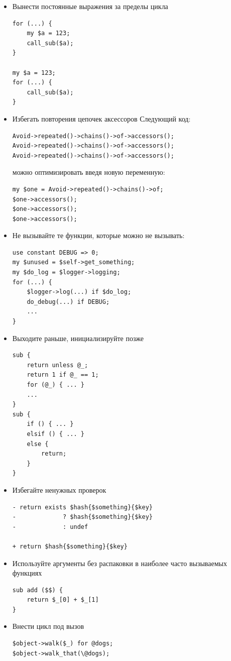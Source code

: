 \begin{itemize}
\item Вынести постоянные выражения за пределы цикла
\begin{verbatim}
for (...) {
	my $a = 123;
	call_sub($a);
}

my $a = 123;
for (...) {
	call_sub($a);
}
\end{verbatim}
	\item Избегать повторения цепочек аксессоров
Следующий код:
\begin{verbatim}
Avoid->repeated()->chains()->of->accessors();
Avoid->repeated()->chains()->of->accessors();
Avoid->repeated()->chains()->of->accessors();
\end{verbatim}
можно оптимизировать введя новую переменную:
\begin{verbatim}
my $one = Avoid->repeated()->chains()->of;
$one->accessors();
$one->accessors();
$one->accessors();
\end{verbatim}
\item Не вызывайте те функции, которые можно не вызывать:
\begin{verbatim}
use constant DEBUG => 0;
my $unused = $self->get_something;
my $do_log = $logger->logging;
for (...) {
	$logger->log(...) if $do_log;
	do_debug(...) if DEBUG;
	...
}
\end{verbatim}

\item Выходите раньше, инициализируйте позже
\begin{verbatim}
sub {
    return unless @_;
    return 1 if @_ == 1;
    for (@_) { ... }
    ...
}
sub {
    if () { ... }
    elsif () { ... }
    else {
        return;
    }
}
\end{verbatim}

\item Избегайте ненужных проверок
\begin{verbatim}
- return exists $hash{$something}{$key}
-             ? $hash{$something}{$key}
-             : undef

+ return $hash{$something}{$key}
\end{verbatim}
\item Используйте аргументы без распаковки в наиболее часто вызываемых функциях
\begin{verbatim}
sub add ($$) {
    return $_[0] + $_[1]
}
\end{verbatim}

\item Внести цикл под вызов
\begin{verbatim}
$object->walk($_) for @dogs;
$object->walk_that(\@dogs);
\end{verbatim}
\end{itemize}


